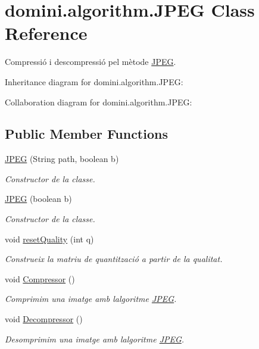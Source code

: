 \hypertarget{classdomini_1_1algorithm_1_1JPEG}{}\section{domini.\+algorithm.\+J\+P\+EG Class Reference}
\label{classdomini_1_1algorithm_1_1JPEG}


Compressió i descompressió pel mètode \hyperlink{classdomini_1_1algorithm_1_1JPEG}{J\+P\+EG}.  




Inheritance diagram for domini.\+algorithm.\+J\+P\+EG\+:


Collaboration diagram for domini.\+algorithm.\+J\+P\+EG\+:
\subsection*{Public Member Functions}
\begin{DoxyCompactItemize}
\item 
\hyperlink{classdomini_1_1algorithm_1_1JPEG_ac489916de8505f11b6e29c7206baf3c7}{J\+P\+EG} (String path, boolean b)
\begin{DoxyCompactList}\small\item\em Constructor de la classe. \end{DoxyCompactList}\item 
\hyperlink{classdomini_1_1algorithm_1_1JPEG_ade39a15f3c5722b4975746fcee6ad364}{J\+P\+EG} (boolean b)
\begin{DoxyCompactList}\small\item\em Constructor de la classe. \end{DoxyCompactList}\item 
void \hyperlink{classdomini_1_1algorithm_1_1JPEG_a860d6166ef8edc40b0ffb61942589e5d}{reset\+Quality} (int q)
\begin{DoxyCompactList}\small\item\em Construeix la matriu de quantització a partir de la qualitat. \end{DoxyCompactList}\item 
void \hyperlink{classdomini_1_1algorithm_1_1JPEG_a753bf49f2c8bde9e54464b21a1bcb2d8}{Compressor} ()
\begin{DoxyCompactList}\small\item\em Comprimim una imatge amb l\textquotesingle{}algoritme \hyperlink{classdomini_1_1algorithm_1_1JPEG}{J\+P\+EG}. \end{DoxyCompactList}\item 
void \hyperlink{classdomini_1_1algorithm_1_1JPEG_accca347e84e41b254d1f4a7bbdf2201a}{Decompressor} ()
\begin{DoxyCompactList}\small\item\em Desomprimim una imatge amb l\textquotesingle{}algoritme \hyperlink{classdomini_1_1algorithm_1_1JPEG}{J\+P\+EG}. \end{DoxyCompactList}\end{DoxyCompactItemize}
